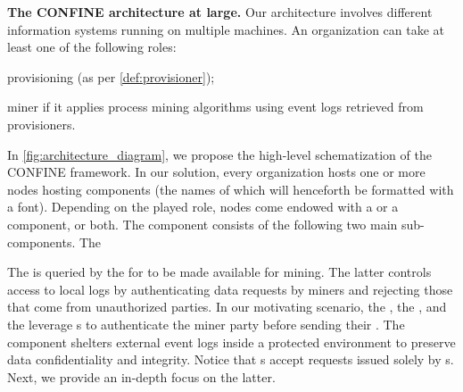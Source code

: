 \noindent\textbf{The CONFINE architecture at large.} Our architecture involves different information systems running on multiple machines. An organization can take at least one of the following roles: 
\begin{inparadesc}
\item[provisioning]  (as per \cref{def:provisioner});
\item[miner] if it applies process mining algorithms using event logs retrieved from provisioners.
\end{inparadesc}
In \cref{fig:architecture_diagram}, we propose the high-level schematization of the CONFINE framework.
In our solution, every organization hosts one or more nodes hosting components (the names of which will henceforth be formatted with a  font). Depending on the played role, nodes come endowed with a  or a  component, or both. The  component consists of the following two main sub-components. The \begin{inparadesc}
\item[\Compo{Log Recorder}] 
\end{inparadesc}
  The  is queried by the  for  to be made available for mining. The latter controls access to local %
logs by authenticating data requests by miners and rejecting those that come from unauthorized parties.
In our motivating scenario, the , the , and the  leverage s to authenticate the miner party before sending their . The  component
shelters external event logs inside a protected environment to preserve data confidentiality and integrity.
Notice that s accept requests issued solely by s. 
Next, we provide an in-depth focus on the latter.

